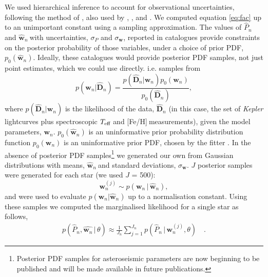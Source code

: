\documentclass[useAMS, usenatbib]{mn2e}
\newcommand{\logg}{log \emph{g}}
\newcommand{\teff}{$T_{\rm{eff}}$}
\newcommand{\w}{\mathbf{w}}
\newcommand{\wh}{$\hat{\mathbf{w}}_n$}
\newcommand{\ph}{$\hat{P}_n$}
\newcommand{\feh}{[Fe/H]}
\begin{document}
We used hierarchical inference to account for observational uncertainties,
following the method of \citet{Hogg2010}, also used by
\citet{Foreman-Mackey2014}, \citet{Rogers2014}, \citet{Morton2014} and
\citet{Demory2014}.
We computed equation \ref{eq:fac} up to an unimportant constant
using a sampling approximation.
The values of \ph$~$and \wh$~$with uncertainties, $\sigma_P$ and
$\sigma_{\mathbf{w}}$, reported in catalogues provide constraints on the
posterior probability of those variables, under a choice of prior PDF,
$p_0(\hat{\mathbf{w}}_n)$.
Ideally, these catalogues would provide posterior PDF samples, not just point
estimates, which we could use directly.
i.e. samples from
\begin{equation}
	p(\mathbf{w}_n|\hat{\mathbf{D}}_n) =
	\frac{p(\hat{\mathbf{D}}_n|\mathbf{w}_n)p_0(\mathbf{w}_n)}
	{p_0(\hat{\mathbf{D}}_n)},
\end{equation}
where $p(\hat{\mathbf{D}}_n|\w_n)$ is the likelihood of the data,
$\hat{\mathbf{D}}_n$ (in this case,
the set of {\it Kepler} lightcurves plus spectroscopic \teff$~$and
\feh$~$measurements), given the model parameters, $\mathbf{w}_n$.
$p_0(\hat{\w}_n)$ is an uninformative prior probability distribution
function $p_0(\mathbf{w}_n)$ is an uninformative prior PDF, chosen by the
fitter \citep[][used a flat prior PDF in age and \logg]{Chaplin2014}.
In the absence of posterior PDF samples\footnote{Posterior PDF samples
for asteroseismic parameters are now beginning to be published and will be made
available in future publications.} we generated our own from Gaussian
distributions with means, \wh$~$and standard deviations, $\sigma_{\mathbf{w}}$.
$J$ posterior samples were generated for each star (we used $J$ = 500):
\begin{equation}
\w_n^{(j)} \sim p(\w_n\,|\,\hat{\w}_n),
\end{equation}
and were used to evaluate $p(\mathbf{w}_n|\hat{\mathbf{w}}_n)$ up to a
normalisation constant.
Using these samples we computed the marginalised likelihood for a single
star as follows,
\begin{align}
	p(\hat{P}_n,\hat{\w_n}\,|\,\theta) \approx \frac{1}{J_n}
	\sum_{j=1}^{J_n}p(\hat{P}_n\,|\,\mathbf{w}_n^{(j)},\theta) \quad.
\end{align}
\end{document}
